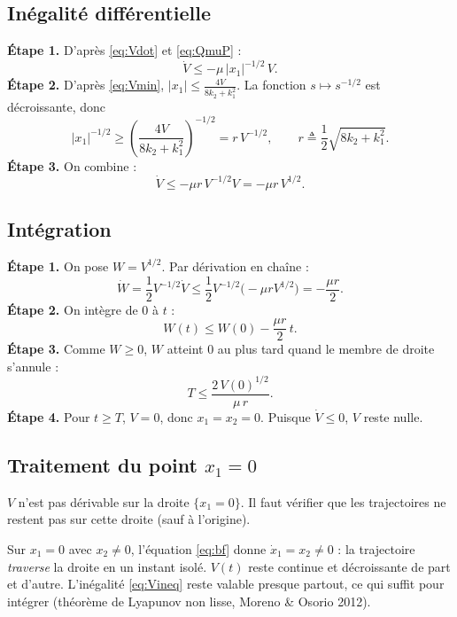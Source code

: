 \documentclass[11pt,a4paper]{article}
\numberwithin{equation}{section}
\theoremstyle{plain}
\theoremstyle{definition}
\theoremstyle{remark}
\begin{document}
\subsection{Inégalité différentielle}
\textbf{Étape 1.} D'après \eqref{eq:Vdot} et \eqref{eq:QmuP} :
\begin{equation}
\dot V \le -\mu\,|x_1|^{-1/2}\,V .
\end{equation}
\textbf{Étape 2.} D'après \eqref{eq:Vmin}, $|x_1|\le\frac{4V}{8k_2+k_1^2}$. La fonction $s\mapsto s^{-1/2}$ est décroissante, donc
\begin{equation}
|x_1|^{-1/2}\ge\left(\frac{4V}{8k_2+k_1^2}\right)^{-1/2} = r\,V^{-1/2},\qquad r\triangleq\frac12\sqrt{8k_2+k_1^2}.
\end{equation}
\textbf{Étape 3.} On combine :
\begin{equation}\label{eq:Vineq}
\boxed{\dot V\le-\mu r\,V^{-1/2}V = -\mu r\,V^{1/2}.}
\end{equation}

\subsection{Intégration}
\textbf{Étape 1.} On pose $W=V^{1/2}$. Par dérivation en chaîne :
\begin{equation}
\dot W = \frac{1}{2}V^{-1/2}\dot V \le \frac12V^{-1/2}\big(-\mu rV^{1/2}\big) = -\frac{\mu r}{2}.
\end{equation}
\textbf{Étape 2.} On intègre de $0$ à $t$ :
\begin{equation}
W(t)\le W(0)-\frac{\mu r}{2}\,t .
\end{equation}
\textbf{Étape 3.} Comme $W\ge0$, $W$ atteint $0$ au plus tard quand le membre de droite s'annule :
\begin{equation}\label{eq:T}
\boxed{T\le\frac{2\,V(0)^{1/2}}{\mu\,r}.}
\end{equation}
\textbf{Étape 4.} Pour $t\ge T$, $V=0$, donc $x_1=x_2=0$. Puisque $\dot V\le0$, $V$ reste nulle.

\subsection{Traitement du point $x_1=0$}
$V$ n'est pas dérivable sur la droite $\{x_1=0\}$. Il faut vérifier que les trajectoires ne
\og restent\fg{} pas sur cette droite (sauf à l'origine).

Sur $x_1=0$ avec $x_2\neq0$, l'équation \eqref{eq:bf} donne $\dot x_1 = x_2\neq0$ : la trajectoire
\emph{traverse} la droite en un instant isolé. $V(t)$ reste continue et décroissante de part et d'autre.
L'inégalité \eqref{eq:Vineq} reste valable presque partout, ce qui suffit pour intégrer
(théorème de Lyapunov non lisse, Moreno \& Osorio 2012).
\end{document}
